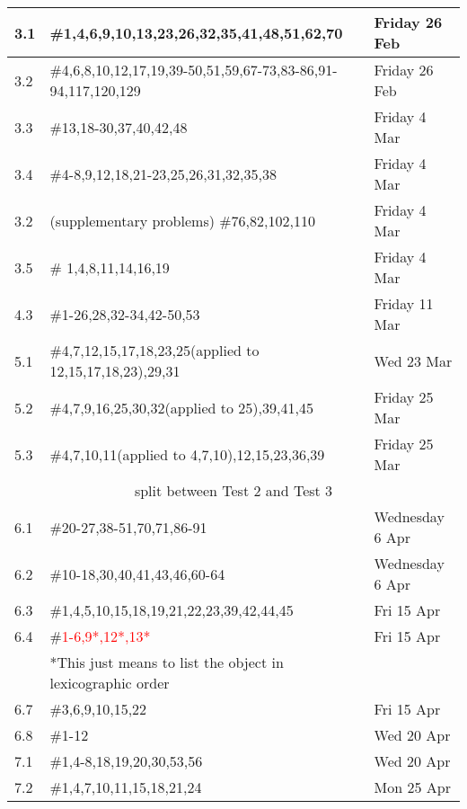 \documentclass[11pt]{article}
\begin{document}
\begin{tabular}{|p{1.6cm}|p{12cm}|p{3cm}|}
\hline
3.1&\#1,4,6,9,10,13,23,26,32,35,41,48,51,62,70& Friday 26 Feb\\
\hline
3.2&\#4,6,8,10,12,17,19,39-50,51,59,67-73,83-86,91-94,117,120,129&Friday 26 Feb\\
\hline
3.3&\#13,18-30,37,40,42,48&Friday 4 Mar\\
\hline
3.4&\#4-8,9,12,18,21-23,25,26,31,32,35,38&Friday 4 Mar\\
\hline
3.2&(supplementary problems) \#76,82,102,110&Friday 4 Mar\\
\hline
3.5&\# 1,4,8,11,14,16,19& Friday 4 Mar\\
\hline
4.3& \#1-26,28,32-34,42-50,53& Friday 11 Mar\\
\hline
5.1&\#4,7,12,15,17,18,23,25(applied to 12,15,17,18,23),29,31& Wed 23 Mar\\
\hline
5.2&\#4,7,9,16,25,30,32(applied to 25),39,41,45&Friday 25 Mar\\
\hline
5.3&\#4,7,10,11(applied to 4,7,10),12,15,23,36,39&Friday 25 Mar\\
\hline
\hline
\multicolumn{3}{c}{split between Test 2 and Test 3}\\
\hline
6.1&\#20-27,38-51,70,71,86-91&Wednesday 6 Apr\\
\hline
6.2& \#10-18,30,40,41,43,46,60-64& Wednesday 6 Apr\\
\hline
6.3&\#1,4,5,10,15,18,19,21,22,23,39,42,44,45& Fri 15 Apr\\
\hline
6.4&\#\textcolor{red}{1-6,9*,12*,13*}&Fri 15 Apr\\
&*This just means to list the object in lexicographic order& \\
\hline
6.7& \#3,6,9,10,15,22 & Fri 15 Apr \\
\hline
6.8&\#1-12& Wed 20 Apr \\
\hline
7.1&\#1,4-8,18,19,20,30,53,56&Wed 20 Apr\\
\hline
7.2&\#1,4,7,10,11,15,18,21,24&Mon 25 Apr\\
\hline
\end{tabular}
\end{document}
